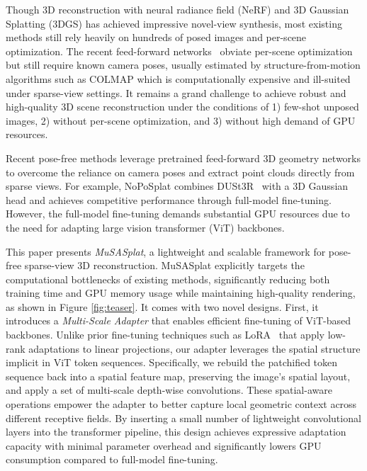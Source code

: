 \documentclass[letterpaper]{article} %
\begin{document}
Though 3D reconstruction with neural radiance field (NeRF) \cite{mildenhall2021nerf} and 3D Gaussian Splatting (3DGS) \cite{kerbl20233d} has achieved impressive novel-view synthesis, most existing methods still rely heavily on hundreds of posed images and per-scene optimization. The recent feed-forward networks~\cite{charatan2024pixelsplat, chen2024mvsplat, chen2024mvsplat360} obviate per-scene optimization but still require known camera poses, usually estimated by structure-from-motion algorithms such as COLMAP \cite{schonberger2016structure} which is computationally expensive and ill-suited under sparse-view settings. It remains a grand challenge to achieve robust and high-quality 3D scene reconstruction under the conditions of 1) few-shot unposed images, 2) without per-scene optimization, and 3) without high demand of GPU resources. 

Recent pose-free methods \cite{smart2024splatt3r, ye2024no, hong2024pf3plat, chen2024zerogs} leverage pretrained feed-forward 3D geometry networks \cite{zhang2025advances, wang2024dust3r, leroy2024grounding} to overcome the reliance on camera poses and extract point clouds directly from sparse views. For example, NoPoSplat \cite{ye2024no} combines DUSt3R~\cite{wang2024dust3r} with a 3D Gaussian head and achieves competitive performance through full-model fine-tuning. However, the full-model fine-tuning demands substantial GPU resources due to the need for adapting large vision transformer (ViT) backbones.

This paper presents \textit{MuSASplat}, a lightweight and scalable framework for pose-free sparse-view 3D reconstruction. MuSASplat explicitly targets the computational bottlenecks of existing methods, significantly reducing both training time and GPU memory usage while maintaining high-quality rendering, as shown in Figure \ref{fig:teaser}. It comes with two novel designs. First, it introduces a \textit{Multi-Scale Adapter} that enables efficient fine-tuning of ViT-based backbones. Unlike prior fine-tuning techniques such as LoRA~\cite{hu2022lora} that apply low-rank adaptations to linear projections, our adapter leverages the spatial structure implicit in ViT token sequences. Specifically, we rebuild the patchified token sequence back into a spatial feature map, preserving the image’s spatial layout, and apply a set of multi-scale depth-wise convolutions. These spatial-aware operations empower the adapter to better capture local geometric context across different receptive fields. By inserting a small number of lightweight convolutional layers into the transformer pipeline, this design achieves expressive adaptation capacity with minimal parameter overhead and significantly lowers GPU consumption compared to full-model fine-tuning.
\end{document}
